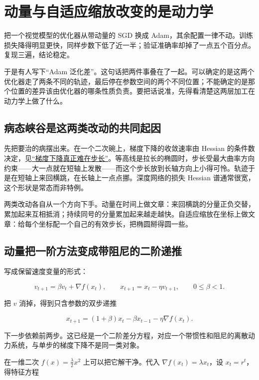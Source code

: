 \section{动量与自适应缩放改变的是动力学}
\label{sec:09-Convex-Optimization/08-Nonconvex-and-Stochastic-Optimization/05}

把一个视觉模型的优化器从带动量的 SGD 换成 Adam，其余配置一律不动。训练损失降得明显更快，同样步数下低了近一半；验证准确率却掉了一点五个百分点。复现三遍，结论稳定。

于是有人写下``Adam 泛化差''。这句话把两件事叠在了一起。可以确定的是这两个优化器走了两条不同的轨迹，最后停在参数空间的两个不同位置；不能确定的是那个位置的差异该由优化器的哪条性质负责。要把话说准，先得看清楚这两层加工在动力学上做了什么。

\subsection{病态峡谷是这两类改动的共同起因}

先把要治的病摆出来。在一个二次碗上，梯度下降的收敛速率由 Hessian 的条件数决定，见\hyperref[sec:09-Convex-Optimization/06-Optimization-Algorithms/01]{``梯度下降真正难在步长''}。等高线是拉长的椭圆时，步长受最大曲率方向约束——大一点就在短轴上发散——而这个步长放到长轴方向上小得可怜。轨迹于是在短轴上来回横跳，在长轴上一点点挪。深度网络的损失 Hessian 谱通常很宽，这个形状是常态而非特例。

两类改动各自从一个方向下手。动量在时间上做文章：来回横跳的分量正负交替，累加起来互相抵消；持续同号的分量累加起来越走越快。自适应缩放在坐标上做文章：给每个坐标配一个自己的有效步长，把椭圆掰得圆一些。

\subsection{动量把一阶方法变成带阻尼的二阶递推}

写成保留速度变量的形式：

\[
v_{t+1}=\beta v_t+\nabla f(x_t),\qquad x_{t+1}=x_t-\eta v_{t+1},\qquad 0\le\beta<1 .
\]

把 \(v\) 消掉，得到只含参数的双步递推

\[
x_{t+1}=(1+\beta)x_t-\beta x_{t-1}-\eta\nabla f(x_t).
\]

下一步依赖前两步。这已经是一个二阶差分方程，对应一个带惯性和阻尼的离散动力系统，与单步的梯度下降不是同一类对象。

在一维二次 \(f(x)=\tfrac\lambda2x^2\) 上可以把它解干净。代入 \(\nabla f(x_t)=\lambda x_t\)，设 \(x_t=r^t\)，得特征方程


